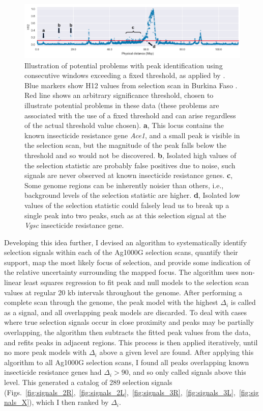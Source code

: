 \documentclass[a4paper,11pt,abstracton,hidelinks]{scrartcl}
\begin{document}
\begin{figure}[t!]
\centering
\includegraphics[width=1.1\textwidth,center]{artwork/chapter5/peak_problems.pdf}
\caption{Illustration of potential problems with peak identification using consecutive windows exceeding a fixed threshold, as applied by \textcite{Garud2015}.
%
Blue markers show H12 values from selection scan in Burkina Faso \agam.
%
Red line shows an arbitrary significance threshold, chosen to illustrate potential problems in these data (these problems are associated with the use of a fixed threshold and can arise regardless of the actual threshold value chosen).
%
\textbf{a}, This locus contains the known insecticide resistance gene \textit{Ace1}, and a small peak is visible in the selection scan, but the magnitude of the peak falls below the threshold and so would not be discovered.
%
\textbf{b}, Isolated high values of the selection statistic are probably false positives due to noise, such signals are never observed at known insecticide resistance genes.
%
\textbf{c}, Some genome regions can be inherently noisier than others, i.e., background levels of the selection statistic are higher.
%
\textbf{d}, Isolated low values of the selection statistic could falsely lead us to break up a single peak into two peaks, such as at this selection signal at the \textit{Vgsc} insecticide resistance gene.
}
\label{fig:peak_problems}
\end{figure}


Developing this idea further, I devised an algorithm to systematically identify selection signals within each of the Ag1000G selection scans, quantify their support, map the most likely focus of selection, and provide some indication of the relative uncertainty surrounding the mapped focus.
%
The algorithm uses non-linear least squares regression to fit peak and null models to the selection scan values at regular 20 kb intervals throughout the genome.
%
After performing a complete scan through the genome, the peak model with the highest $\Delta_i$ is called as a signal, and all overlapping peak models are discarded.
%
To deal with cases where true selection signals occur in close proximity and peaks may be partially overlapping, the algorithm then subtracts the fitted peak values from the data, and refits peaks in adjacent regions.
%
This process is then applied iteratively, until no more peak models with $\Delta_i$ above a given level are found.
%
After applying this algorithm to all Ag1000G selection scans, I found all peaks overlapping known insecticide resistance genes had $\Delta_i > 90$, and so only called signals above this level.
%
This generated a catalog of 289 selection signals (Figs.~\ref{fig:signals_2R},~\ref{fig:signals_2L},~\ref{fig:signals_3R},~\ref{fig:signals_3L},~\ref{fig:signals_X}), which I then ranked by $\Delta_i$.
%
\end{document}
